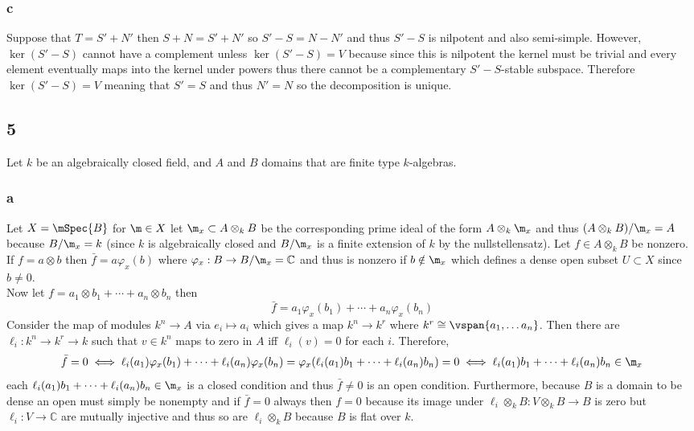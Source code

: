 \documentclass[12pt]{article}
\renewcommand{\C}{\mathbb{C}}
\begin{document}
\subsubsection{c}

Suppose that $T = S' + N'$ then $S + N = S' + N'$ so $S' - S = N - N'$ and thus $S' - S$ is nilpotent and also semi-simple. However, $\ker{(S' - S)}$ cannot have a complement unless $\ker{(S' - S)} = V$ because since this is nilpotent the kernel must be trivial and every element eventually maps into the kernel under powers thus there cannot be a complementary $S' - S$-stable subspace. Therefore $\ker{(S' - S)} = V$ meaning that $S' = S$ and thus $N' = N$ so the decomposition is unique.


\subsection{5}

Let $k$ be an algebraically closed field, and $A$ and $B$ domains that are finite type $k$-algebras.

\subsubsection{a}

Let $X = \mSpec{B}$ for $\m \in X$ let $\m_x \subset A \otimes_k B$ be the corresponding prime ideal of the form $A \otimes_k \m_x$ and thus $(A \otimes_k B)/\m_x = A$ because $B / \m_x = k$ (since $k$ is algebraically closed and $B / \m_x$ is a finite extension of $k$ by the nullstellensatz). Let $f \in A \otimes_k B$ be nonzero. If $f = a \otimes b$ then $\bar{f} = a \varphi_x(b)$ where $\varphi_x : B \to B / \m_x = \C$ and thus is nonzero if $b \notin \m_x$ which defines a dense open subset $U \subset X$ since $b \neq 0$.
\bigskip\\
Now let $f = a_1 \otimes b_1 + \cdots + a_n \otimes b_n$ then 
\[ \bar{f} = a_1 \varphi_x(b_1) + \cdots + a_n \varphi_x(b_n) \]
Consider the map of modules $k^n \to A$ via $e_i \mapsto a_i$ which gives a map $k^n \to k^r$ where $k^r \cong \vspan\{ a_1, \dots a_n \}$. Then there are $\ell_i : k^n \to k^r \to k$ such that $v \in k^n$ maps to zero in $A$ iff $\ell_i(v) = 0$ for each $i$. Therefore,
\[ \bar{f} = 0 \iff \ell_i(a_1) \varphi_x(b_1) + \cdots + \ell_i(a_n) \varphi_x(b_n) = \varphi_x( \ell_i(a_1) b_1 + \cdots + \ell_i(a_n) b_n) = 0 \iff \ell_i(a_1) b_1 + \cdots + \ell_i(a_n) b_n \in \m_x \]
each $\ell_i(a_1) b_1 + \cdots + \ell_i(a_n) b_n \in \m_x$ is a closed condition and thus $\bar{f} \neq 0$ is an open condition. Furthermore, because $B$ is a domain to be dense an open must simply be nonempty and if $\bar{f} = 0$ always then $f = 0$ because its image under $\ell_i \otimes_k B : V \otimes_k B \to B$ is zero but $\ell_i : V \to \C$ are mutually injective and thus so are $\ell_i \otimes_k B$ because $B$ is flat over $k$.
\end{document}
